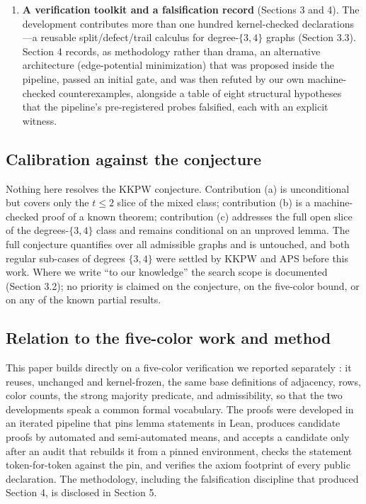 \documentclass[11pt]{article}
\theoremstyle{definition}
\theoremstyle{remark}
\begin{document}
\begin{enumerate}
\item
  \textbf{A verification toolkit and a falsification record} (Sections 3 and 4). The development contributes more than one hundred kernel-checked declarations---a reusable split/defect/trail calculus for degree-$\{3,4\}$ graphs (Section 3.3). Section 4 records, as methodology rather than drama, an alternative architecture (edge-potential minimization) that was proposed inside the pipeline, passed an initial gate, and was then refuted by our own machine-checked counterexamples, alongside a table of eight structural hypotheses that the pipeline's pre-registered probes falsified, each with an explicit witness.
\end{enumerate}

\subsection{Calibration against the conjecture}\label{13-calibration}

Nothing here resolves the KKPW conjecture. Contribution (a) is unconditional but covers only the $t \le 2$ slice of the mixed class; contribution (b) is a machine-checked proof of a known theorem; contribution (c) addresses the full open slice of the degrees-$\{3,4\}$ class and remains conditional on an unproved lemma. The full conjecture quantifies over all admissible graphs and is untouched, and both regular sub-cases of degrees $\{3,4\}$ were settled by KKPW and APS before this work. Where we write ``to our knowledge'' the search scope is documented (Section 3.2); no priority is claimed on the conjecture, on the five-color bound, or on any of the known partial results.

\subsection{Relation to the five-color work and method}\label{14-relation}

This paper builds directly on a five-color verification we reported separately \cite{E5}: it reuses, unchanged and kernel-frozen, the same base definitions of adjacency, rows, color counts, the strong majority predicate, and admissibility, so that the two developments speak a common formal vocabulary. The proofs were developed in an iterated pipeline that pins lemma statements in Lean, produces candidate proofs by automated and semi-automated means, and accepts a candidate only after an audit that rebuilds it from a pinned environment, checks the statement token-for-token against the pin, and verifies the axiom footprint of every public declaration. The methodology, including the falsification discipline that produced Section 4, is disclosed in Section 5.
\end{document}
